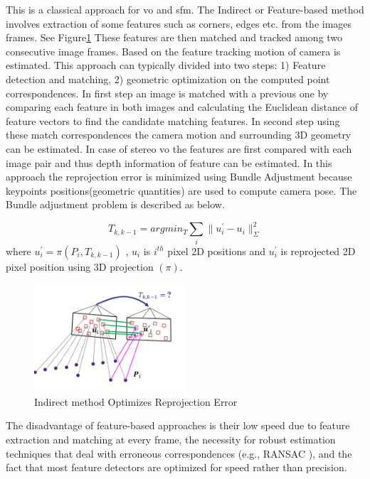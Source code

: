 This is a classical approach for \acrshort{vo} and \acrshort{sfm}. The Indirect or Feature-based method involves extraction of some features such as corners, edges etc. from the images frames. See Figure\ref{fig:feature} These features are then matched and tracked among two consecutive image frames. Based on the feature tracking motion of camera is estimated.  This approach can typically divided into two steps: 1) Feature detection and matching, 2) geometric optimization on the computed point correspondences. In first step an image is matched with a previous one by comparing each feature in both images and calculating the Euclidean distance of feature vectors to find the candidate matching features.\cite{Aqel-et-al-2016} In second step using these match correspondences the camera motion and surrounding 3D geometry can be estimated. In case of stereo \acrshort{vo} the features are first compared with each image pair and thus depth information of feature can be estimated. In this approach the reprojection error is minimized using Bundle Adjustment because keypoints positions(geometric quantities) are used to compute camera pose. The Bundle adjustment problem is described as below. 

\begin{equation*}
	T_{k,k-1} = arg min_{T} \sum_{i} \| u^{'}_{i}- u_{i}\|^{2}_{\Sigma}
\end{equation*}
where   $u^{'}_{i} = \pi (P_{i},T_{k,k-1})$ , $ u_{i} $ is $ i^{th} $  pixel 2D positions and $ u^{'}_{i} $ is reprojected 2D pixel position using 3D projection $(\pi)$.  

\begin{figure}[h]
	\centering
	\includegraphics[width=0.5\textwidth]{indirect}
	\caption{Indirect method Optimizes Reprojection Error}
	\label{fig:feature}
\end{figure}

The disadvantage of feature-based approaches is their low speed due to feature extraction and matching at every frame, the necessity for robust estimation techniques that deal with erroneous correspondences (e.g., RANSAC ), and the fact that most feature detectors are optimized for speed rather than precision.\cite{7782863}


